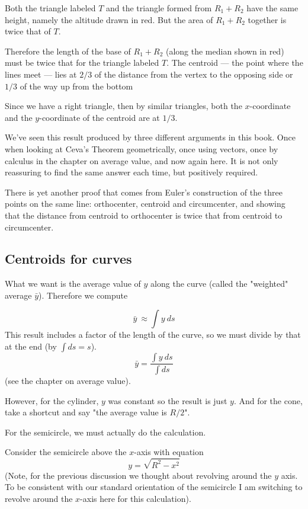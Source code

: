 \documentclass[11pt, oneside]{article}   	%
\begin{document}
Both the triangle labeled $T$ and the triangle formed from $R_1 + R_2$ have the same height, namely the altitude drawn in red.  But the area of $R_1 + R_2$ together is twice that of $T$.  

Therefore the length of the base of $R_1 + R_2$ (along the median shown in red) must be twice that for the triangle labeled $T$.  The centroid --- the point where the lines meet --- lies at $2/3$ of the distance from the vertex to the opposing side or $1/3$ of the way up from the bottom

Since we have a right triangle, then by similar triangles, both the $x$-coordinate and the $y$-coordinate of the centroid are at $1/3$.

We've seen this result produced by three different arguments in this book.  Once when looking at Ceva's Theorem geometrically, once using vectors, once by calculus in the chapter on average value, and now again here.  It is not only reassuring to find the same answer each time, but positively required.

 There is yet another proof that comes from Euler's construction of the three points on the same line:  orthocenter, centroid and circumcenter, and showing that the distance from centroid to orthocenter is twice that from centroid to circumcenter.

\subsection*{Centroids for curves}

What we want is the average value of $y$ along the curve (called the "weighted" average $\bar{y}$).  Therefore we compute

\[ \bar{y}  \ \approx \int y \ ds \]
This result includes a factor of the length of the curve, so we must divide by that at the end (by $\int ds = s$).
\[ \bar{y} = \frac{\int y \ ds}{\int ds} \]
(see the chapter on average value).

However, for the cylinder, $y$ was constant so the result is just $y$.  And for the cone, take a shortcut and say "the average value is $R/2$".

For the semicircle, we must actually do the calculation.

Consider the semicircle above the $x$-axis with equation
\[ y = \sqrt{R^2 - x^2} \]
(Note, for the previous discussion we thought about revolving around the $y$ axis.  To be consistent with our standard orientation of the semicircle I am switching to revolve around the $x$-axis here for this calculation).
\end{document}
